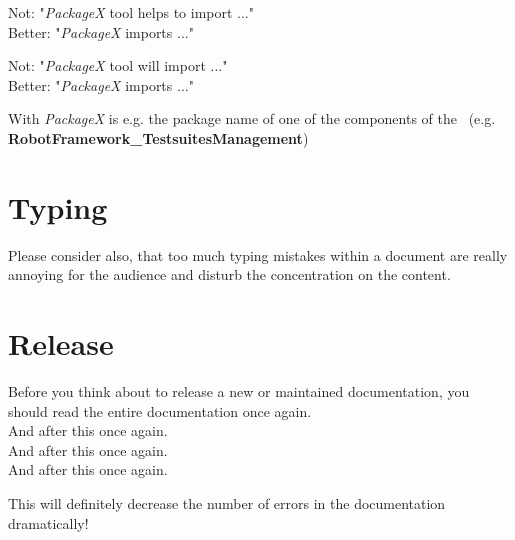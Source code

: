 \documentclass[a4paper,10pt]{report}
\begin{document}
Not: "\textit{PackageX} tool helps to import ..."\\
Better: "\textit{PackageX} imports ..."

Not: "\textit{PackageX} tool will import ..."\\
Better: "\textit{PackageX} imports ..."

With \textit{PackageX} is e.g. the package name of one of the components of the \rfw\ (e.g.
\textbf{RobotFramework\_TestsuitesManagement})

\section{Typing}

Please consider also, that too much typing mistakes within a document are really annoying for the audience and disturb the concentration on the content.

\section{Release}

Before you think about to release a new or maintained documentation, you should read the entire documentation once again.\\
And after this once again.\\
And after this once again.\\
And after this once again.

This will definitely decrease the number of errors in the documentation dramatically!

\end{document}
